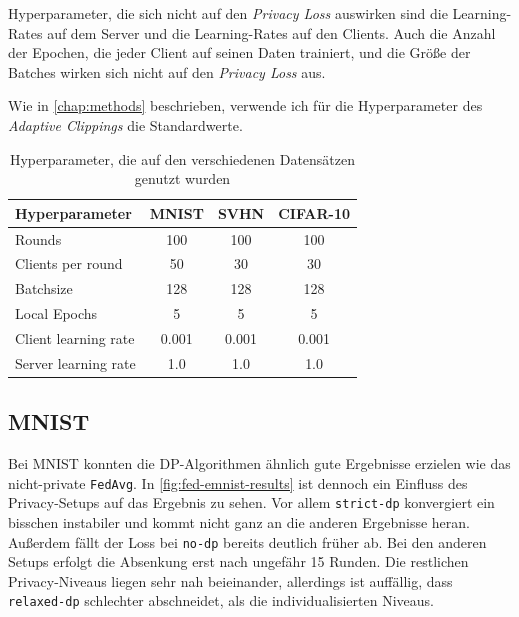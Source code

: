Hyperparameter, die sich nicht auf den \textit{Privacy Loss} auswirken sind die Learning-Rates auf dem Server und die Learning-Rates auf den Clients. Auch die Anzahl der Epochen, die jeder Client auf seinen Daten trainiert, und die Größe der Batches wirken sich nicht auf den \textit{Privacy Loss} aus.

Wie in \autoref{chap:methods} beschrieben, verwende ich für die Hyperparameter des \textit{Adaptive Clippings} die Standardwerte.

\begin{table}[tb]
	\centering
	\caption{Hyperparameter, die auf den verschiedenen Datensätzen genutzt wurden}
	\begin{tabular}{lccc}
		\toprule
		Hyperparameter & MNIST & SVHN & CIFAR-10 \\
		\midrule
		Rounds & 100 & 100 & 100 \\
		Clients per round & 50 & 30 & 30 \\
		Batchsize & 128 & 128 & 128 \\
		Local Epochs & 5 & 5 & 5 \\
		Client learning rate & 0.001 & 0.001 & 0.001 \\
		Server learning rate & 1.0 & 1.0 & 1.0 \\
		\bottomrule
	\end{tabular}
	\label{tab:fl-hyperparameters}
\end{table}

\subsection{MNIST}

Bei MNIST konnten die DP-Algorithmen ähnlich gute Ergebnisse erzielen wie das nicht-private \texttt{FedAvg}. In \autoref{fig:fed-emnist-results} ist dennoch ein Einfluss des Privacy-Setups auf das Ergebnis zu sehen. Vor allem \texttt{strict-dp} konvergiert ein bisschen instabiler und kommt nicht ganz an die anderen Ergebnisse heran. Außerdem fällt der Loss bei \texttt{no-dp} bereits deutlich früher ab. Bei den anderen Setups erfolgt die Absenkung erst nach ungefähr 15 Runden. Die restlichen Privacy-Niveaus liegen sehr nah beieinander, allerdings ist auffällig, dass \texttt{relaxed-dp} schlechter abschneidet, als die individualisierten Niveaus.

